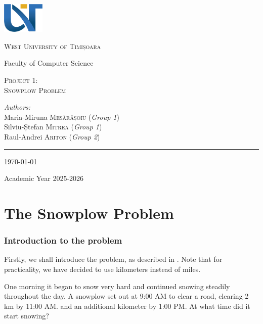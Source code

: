 \documentclass[a4paper,12pt]{article}
\begin{document}
\begin{titlepage}
	\vspace*{-3cm}
	\centering
		\includegraphics[width=2cm]{assets/uvt_logo_en.png}

	{\scshape\LARGE West University of Timișoara\par}

	\vspace{1cm}

	{\large Faculty of Computer Science}

	\vspace{.1\textheight}
	{ \LARGE \scshape Project 1: \\ Snowplow Problem \par}

		\vspace{.1\linewidth}

			{\emph{Authors:} \\
			Maria-Miruna \textsc{Mesărășoiu} (\textit{Group 1}) \\
            Silviu-Ștefan \textsc{Mitrea} (\textit{Group 1}) \\
            Raul-Andrei \textsc{Ariton} (\textit{Group 2})    
            }

			\vfill

			\rule{.4\textwidth}{.4pt}

	{\large \today\par
	Academic Year 2025-2026\par}
\end{titlepage}

\tableofcontents \newpage

\part{The Snowplow Problem}
\section{Introduction to the problem}
    Firstly, we shall introduce the problem, as described in \cite{nagle2012fundamentals}. Note that for practicality, we have decided to use kilometers instead of miles.

    \begin{framed}
        \noindent One morning it began to snow very hard and continued snowing steadily throughout the day. A snowplow set out at 9:00 AM to clear a road, clearing 2 \unit{\kilo\meter} by 11:00 AM. and an additional kilometer by 1:00 PM. At what time did it start snowing?
    \end{framed}
    
\end{document}
